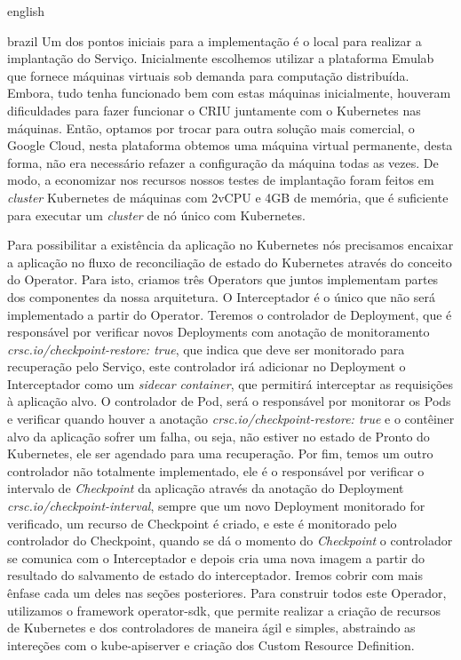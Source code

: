 \begin{otherlanguage*}{english}
\begin{otherlanguage*}{brazil}
Um dos pontos iniciais para a implementação é o local para realizar a implantação do
Serviço. Inicialmente escolhemos utilizar a plataforma Emulab \cite{White+:osdi02}
que fornece máquinas virtuais sob demanda para computação distribuída. Embora, tudo
tenha funcionado bem com estas máquinas inicialmente, houveram dificuldades para
fazer funcionar o CRIU juntamente com o Kubernetes nas máquinas. Então, optamos por
trocar para outra solução mais comercial, o Google Cloud, nesta plataforma obtemos
uma máquina virtual permanente, desta forma, não era necessário refazer a configuração
da máquina todas as vezes. De modo, a economizar nos recursos nossos testes de
implantação foram feitos em \textit{cluster} Kubernetes de máquinas com 2vCPU e 4GB
de memória, que é suficiente para executar um \textit{cluster} de nó único com Kubernetes.

Para possibilitar a existência da aplicação no Kubernetes nós precisamos encaixar a
aplicação no fluxo de reconciliação de estado do Kubernetes através do conceito do Operator.
Para isto, criamos três Operators que juntos implementam partes dos componentes da
nossa arquitetura. O Interceptador é o único que não será implementado a partir do Operator.
Teremos o controlador de Deployment, que é responsável por verificar novos Deployments
com anotação de monitoramento \textit{crsc.io/checkpoint-restore: true}, que indica que deve
ser monitorado para recuperação pelo Serviço, este controlador irá adicionar no Deployment
o Interceptador como um \textit{sidecar container}, que permitirá interceptar as requisições
à aplicação alvo. O controlador de Pod, será o responsável por monitorar os Pods e
verificar quando houver a anotação \textit{crsc.io/checkpoint-restore: true} e o contêiner
alvo da aplicação sofrer um falha, ou seja, não estiver no estado de Pronto do Kubernetes,
ele ser agendado para uma recuperação. Por fim, temos um outro controlador não totalmente
implementado, ele é o responsável por verificar o intervalo de \textit{Checkpoint} da
aplicação através da anotação do Deployment \textit{crsc.io/checkpoint-interval}, sempre
que um novo Deployment monitorado for verificado, um recurso de Checkpoint é criado, e este
é monitorado pelo controlador do Checkpoint, quando se dá o momento do \textit{Checkpoint}
o controlador se comunica com o Interceptador e depois cria uma nova imagem a partir do
resultado do salvamento de estado do interceptador. Iremos cobrir com mais ênfase cada um
deles nas seções posteriores. Para construir todos este Operador, utilizamos o framework
operator-sdk, que permite realizar a criação de recursos de Kubernetes e dos controladores
de maneira ágil e simples, abstraindo as intereções com o kube-apiserver e criação dos
Custom Resource Definition.


\end{otherlanguage*}
\end{otherlanguage*}
